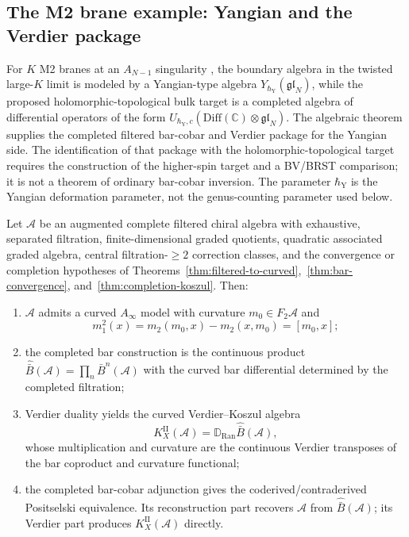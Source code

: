 \subsection{The M2 brane example: Yangian and the Verdier package}

\begin{example}\label{ex:M2-brane}
For $K$ M2 branes at an $A_{N-1}$ singularity
\cite{Costello-1705.02500v1}, the boundary algebra in the twisted
large-$K$ limit is modeled by a Yangian-type algebra
$Y_{\hbar_{\mathrm{Y}}}(\mathfrak{gl}_N)$, while the proposed
holomorphic-topological bulk target is a completed algebra of
differential operators of the form
$U_{\hbar_{\mathrm{Y}},c}(\mathrm{Diff}(\mathbb C)\otimes\mathfrak{gl}_N)$.
The algebraic theorem supplies the completed filtered bar-cobar and
Verdier package for the Yangian side.  The identification of that
package with the holomorphic-topological target requires the construction of the
higher-spin target and a BV/BRST comparison; it is not a theorem of
ordinary bar-cobar inversion.  The parameter $\hbar_{\mathrm{Y}}$ is
the Yangian deformation parameter, not the genus-counting parameter
used below.
\end{example}

\begin{theorem}\label{thm:curved-koszul}
Let $\mathcal{A}$ be an augmented complete filtered chiral algebra with
exhaustive, separated filtration, finite-dimensional graded quotients,
quadratic associated graded algebra, central filtration-$\ge2$
correction classes, and the convergence or completion hypotheses of
Theorems~\ref{thm:filtered-to-curved},~\ref{thm:bar-convergence},
and~\ref{thm:completion-koszul}.
Then:
\begin{enumerate}[label=\textup{(\roman*)}]
\item $\mathcal{A}$ admits a curved $A_\infty$ model with curvature
$m_0\in F_2\mathcal A$ and
\[
m_1^2(x)=m_2(m_0,x)-m_2(x,m_0)=[m_0,x];
\]
\item the completed bar construction is the continuous product
$\widehat{\bar{B}}(\mathcal{A})=\prod_n\bar{B}^n(\mathcal A)$ with
the curved bar differential determined by the completed filtration;
\item Verdier duality yields the curved Verdier--Koszul algebra
\[
K_X^{\mathrm{II}}(\mathcal A)
=
\mathbb{D}_{\mathrm{Ran}}\widehat{\bar{B}}(\mathcal{A}),
\]
whose multiplication and curvature are the continuous Verdier
transposes of the bar coproduct and curvature functional;
\item the completed bar-cobar adjunction gives the
coderived/contraderived Positselski equivalence.  Its reconstruction
part recovers $\mathcal A$ from $\widehat{\bar{B}}(\mathcal A)$; its
Verdier part produces $K_X^{\mathrm{II}}(\mathcal A)$ directly.
\end{enumerate}
\end{theorem}


